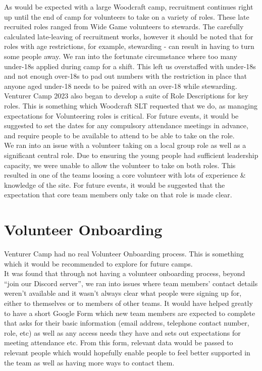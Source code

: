 As would be expected with a large Woodcraft camp, recruitment continues right up until the end of camp for volunteers to take on a variety of roles. These late recruited roles ranged from Wide Game volunteers to stewards. The carefully calculated late-leaving of recruitment works, however it should be noted that for roles with age restrictions, for example, stewarding - can result in having to turn some people away. We ran into the fortunate circumstance where too many under-18s applied during camp for a shift. This left us overstaffed with under-18s and not enough over-18s to pad out numbers with the restriction in place that anyone aged under-18 needs to be paired with an over-18 while stewarding. \\

Venturer Camp 2023 also began to develop a suite of Role Descriptions for key roles. This is something which Woodcraft SLT requested that we do, as managing expectations for Volunteering roles is critical. For future events, it would be suggested to set the dates for any compulsory attendance meetings in advance, and require people to be available to attend to be able to take on the role. \\

We ran into an issue with a volunteer taking on a local group role as well as a significant central role. Due to ensuring the young people had sufficient leadership capacity, we were unable to allow the volunteer to take on both roles. This resulted in one of the teams loosing a core volunteer with lots of experience \& knowledge of the site. For future events, it would be suggested that the expectation that core team members only take on that role is made clear.

\section{Volunteer Onboarding}
Venturer Camp had no real Volunteer Onboarding process. This is something which it would be recommended to explore for future camps.\\

It was found that through not having a volunteer onboarding process, beyond ``join our Discord server'', we ran into issues where team members' contact details weren't available and it wasn't always clear what people were signing up for, either to themselves or to members of other teams. It would have helped greatly to have a short Google Form which new team members are expected to complete that asks for their basic information (email address, telephone contact number, role, etc) as well as any access needs they have and sets out expectations for meeting attendance etc. From this form, relevant data would be passed to relevant people which would hopefully enable people to feel better supported in the team as well as having more ways to contact them. 
